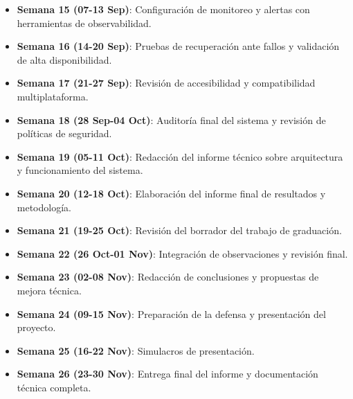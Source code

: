 \begin{itemize}
  \item \textbf{Semana 15 (07-13 Sep)}: Configuración de monitoreo y alertas con herramientas de observabilidad.
  \item \textbf{Semana 16 (14-20 Sep)}: Pruebas de recuperación ante fallos y validación de alta disponibilidad.
  \item \textbf{Semana 17 (21-27 Sep)}: Revisión de accesibilidad y compatibilidad multiplataforma.
  \item \textbf{Semana 18 (28 Sep-04 Oct)}: Auditoría final del sistema y revisión de políticas de seguridad.
  \item \textbf{Semana 19 (05-11 Oct)}: Redacción del informe técnico sobre arquitectura y funcionamiento del sistema.
  \item \textbf{Semana 20 (12-18 Oct)}: Elaboración del informe final de resultados y metodología.
  \item \textbf{Semana 21 (19-25 Oct)}: Revisión del borrador del trabajo de graduación.
  \item \textbf{Semana 22 (26 Oct-01 Nov)}: Integración de observaciones y revisión final.
  \item \textbf{Semana 23 (02-08 Nov)}: Redacción de conclusiones y propuestas de mejora técnica.
  \item \textbf{Semana 24 (09-15 Nov)}: Preparación de la defensa y presentación del proyecto.
  \item \textbf{Semana 25 (16-22 Nov)}: Simulacros de presentación.
  \item \textbf{Semana 26 (23-30 Nov)}: Entrega final del informe y documentación técnica completa.
\end{itemize}
